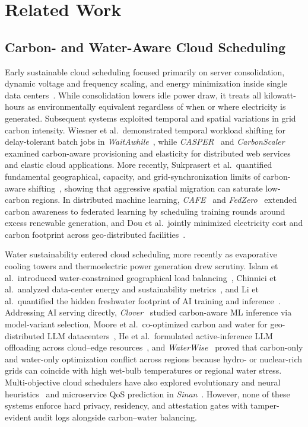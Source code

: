 \documentclass[conference]{IEEEtran}
\begin{document}
\section{Related Work}
\label{sec:related}

\subsection{Carbon- and Water-Aware Cloud Scheduling}
Early sustainable cloud scheduling focused primarily on server consolidation, dynamic voltage and frequency scaling, and energy minimization inside single data centers~\cite{beloglazov2012energy}. While consolidation lowers idle power draw, it treats all kilowatt-hours as environmentally equivalent regardless of when or where electricity is generated. Subsequent systems exploited temporal and spatial variations in grid carbon intensity. Wiesner et al.\ demonstrated temporal workload shifting for delay-tolerant batch jobs in \textit{WaitAwhile}~\cite{wiesner2021waitawhile}, while \textit{CASPER}~\cite{souza2023casper} and \textit{CarbonScaler}~\cite{hanafy2023carbonscaler} examined carbon-aware provisioning and elasticity for distributed web services and elastic cloud applications. More recently, Sukprasert et al.\ quantified fundamental geographical, capacity, and grid-synchronization limits of carbon-aware shifting~\cite{sukprasert2024limitations}, showing that aggressive spatial migration can saturate low-carbon regions. In distributed machine learning, \textit{CAFE}~\cite{bian2024cafe} and \textit{FedZero}~\cite{wiesner2024fedzero} extended carbon awareness to federated learning by scheduling training rounds around excess renewable generation, and Dou et al.\ jointly minimized electricity cost and carbon footprint across geo-distributed facilities~\cite{dou2017carbon}.

Water sustainability entered cloud scheduling more recently as evaporative cooling towers and thermoelectric power generation drew scrutiny. Islam et al.\ introduced water-constrained geographical load balancing~\cite{islam2015watch}, Chinnici et al.\ analyzed data-center energy and sustainability metrics~\cite{chinnici2024sustainability}, and Li et al.\ quantified the hidden freshwater footprint of AI training and inference~\cite{li2025thirsty}. Addressing AI serving directly, \textit{Clover}~\cite{li2023clover} studied carbon-aware ML inference via model-variant selection, Moore et al.\ co-optimized carbon and water for geo-distributed LLM datacenters~\cite{moore2025llm}, He et al.\ formulated active-inference LLM offloading across cloud--edge resources~\cite{he2024llm}, and \textit{WaterWise}~\cite{jiang2025waterwise} proved that carbon-only and water-only optimization conflict across regions because hydro- or nuclear-rich grids can coincide with high wet-bulb temperatures or regional water stress. Multi-objective cloud schedulers have also explored evolutionary and neural heuristics~\cite{tcc2023emo,tcc2017ga,fgcs2019nn,malti2022multi} and microservice QoS prediction in \textit{Sinan}~\cite{zhang2021sinan}. However, none of these systems enforce hard privacy, residency, and attestation gates with tamper-evident audit logs alongside carbon--water balancing.
\end{document}
